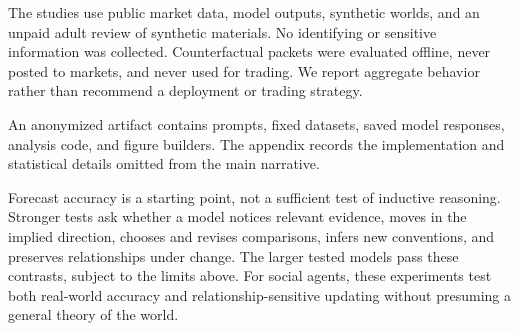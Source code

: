 The studies use public market data, model outputs, synthetic worlds, and an unpaid
adult review of synthetic materials. No identifying or sensitive information was
collected. Counterfactual packets were evaluated offline, never posted to markets,
and never used for trading. We report aggregate behavior rather than recommend a
deployment or trading strategy.

An anonymized artifact contains prompts, fixed datasets, saved model responses,
analysis code, and figure builders.
The appendix records the implementation and statistical details omitted from the
main narrative.

Forecast accuracy is a starting point, not a sufficient test of inductive
reasoning. Stronger tests ask whether a model notices relevant evidence, moves in
the implied direction, chooses and revises comparisons, infers new conventions,
and preserves relationships under change. The larger tested models pass these
contrasts, subject to the limits above. For social agents, these experiments test
both real-world accuracy and relationship-sensitive updating without presuming a
general theory of the world.
